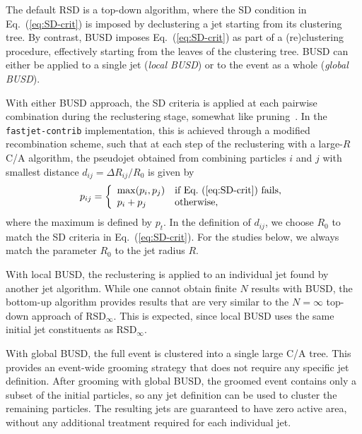 \documentclass[11pt,a4paper]{article}
\newcommand{\RSDinf}{\text{RSD}_\infty}
\DeclareRobustCommand{\Eq}[1]{Eq.~(\ref{#1})}
\begin{document}
The default RSD is a top-down algorithm, where the SD condition in
\Eq{eq:SD-crit} is imposed by declustering a jet starting from its
clustering tree.
%
By contrast, BUSD imposes \Eq{eq:SD-crit} as part of a (re)clustering
procedure, effectively starting from the leaves of the clustering
tree.
%
BUSD can either be applied to a single jet (\emph{local BUSD}) or to
the event as a whole (\emph{global BUSD}).

With either BUSD approach, the SD criteria is applied at each pairwise combination
during the reclustering stage, somewhat like
pruning~\cite{Ellis:2009me}.
%
In the \texttt{fastjet-contrib} implementation, this is achieved through a modified recombination scheme, such that at each step of the reclustering with a large-$R$ C/A algorithm, the pseudojet obtained from combining particles $i$ and $j$ with smallest distance $d_{ij} = \Delta R_{ij}/R_0$ is given by
\begin{equation}
  p_{ij} =
\left\{
	\begin{array}{ll}
		\max(p_i,p_j)  & \mbox{if \Eq{eq:SD-crit} fails,}  \\
		p_i + p_j & \mbox{otherwise,}
	\end{array}
\right.
\end{equation}
where the maximum is defined by $p_t$.
%
In the definition of $d_{ij}$, we choose $R_0$ to match the SD criteria in \Eq{eq:SD-crit}.
%
For the studies below, we always match the parameter $R_0$ to the jet radius $R$.


With local BUSD, the reclustering is applied to an individual jet found by another jet algorithm.
%
While one cannot obtain finite $N$ results with BUSD, the bottom-up algorithm provides results that are very similar to the $N=\infty$
top-down approach of $\RSDinf$.
%
This is expected, since local BUSD uses the same initial jet constituents as $\RSDinf$.

With global BUSD, the full event is clustered into a single large C/A tree.
%
This provides an event-wide grooming strategy that does not require any specific jet definition.
%
After grooming with global BUSD, the groomed event contains only a subset of the initial particles, so any jet definition can be used to cluster the remaining particles.
%
The resulting jets are guaranteed to have zero active area, without any additional treatment required for each individual jet.
\end{document}
